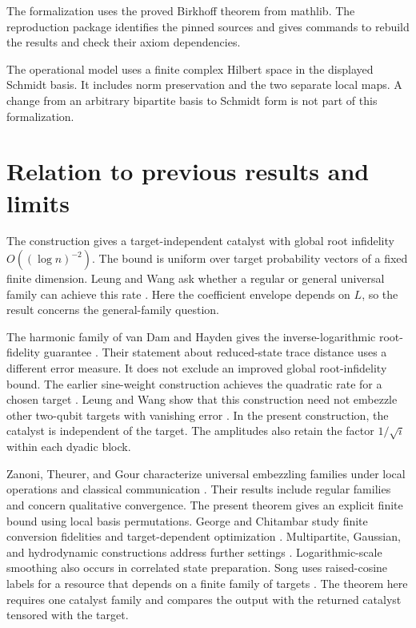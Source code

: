 \documentclass[11pt]{article}
\begin{document}
The formalization uses the proved Birkhoff theorem from mathlib. The reproduction package identifies the pinned sources and gives commands to rebuild the results and check their axiom dependencies.

The operational model uses a finite complex Hilbert space in the displayed Schmidt basis. It includes norm preservation and the two separate local maps. A change from an arbitrary bipartite basis to Schmidt form is not part of this formalization.

\section{Relation to previous results and limits}

The construction gives a target-independent catalyst with global root infidelity $O((\log n)^{-2})$. The bound is uniform over target probability vectors of a fixed finite dimension. Leung and Wang ask whether a regular or general universal family can achieve this rate \cite{lw}. Here the coefficient envelope depends on $L$, so the result concerns the general-family question.

The harmonic family of van Dam and Hayden gives the inverse-logarithmic root-fidelity guarantee \cite{vdh}. Their statement about reduced-state trace distance uses a different error measure. It does not exclude an improved global root-infidelity bound. The earlier sine-weight construction achieves the quadratic rate for a chosen target \cite{ltw}. Leung and Wang show that this construction need not embezzle other two-qubit targets with vanishing error \cite{lw}. In the present construction, the catalyst is independent of the target. The amplitudes also retain the factor $1/\sqrt i$ within each dyadic block.

Zanoni, Theurer, and Gour characterize universal embezzling families under local operations and classical communication \cite{ztg}. Their results include regular families and concern qualitative convergence. The present theorem gives an explicit finite bound using local basis permutations. George and Chitambar study finite conversion fidelities and target-dependent optimization \cite{gc}. Multipartite, Gaussian, and hydrodynamic constructions address further settings \cite{multipartite,gaussian,hydro}. Logarithmic-scale smoothing also occurs in correlated state preparation. Song uses raised-cosine labels for a resource that depends on a finite family of targets \cite{song}. The theorem here requires one catalyst family and compares the output with the returned catalyst tensored with the target.
\end{document}
